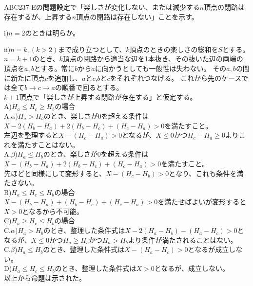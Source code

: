 \documentclass[11pt]{jsarticle}
\begin{document}
	ABC237-Eの問題設定で「楽しさが変化しない、または減少する$n$頂点の閉路は存在するが、上昇する$n$頂点の閉路は存在しない」ことを示す。
	\par i)$n = 2$のときは明らか。
	\par ii)$n = k,(k > 2)$まで成り立つとして、$k$頂点のときの楽しさの総和を$S$とする。
			$n = k + 1$のとき、$k$頂点の閉路から適当な辺を1本抜き、その抜いた辺の両端の頂点を$a,b$とする。常に$b$から$a$に向かうとしても一般性は失わない。
			その$a,b$の間に新たに頂点$c$を追加し、$a$と$c$,$b$と$c$をそれぞれつなげる。	これから先のケースでは全て$b \rightarrow c \rightarrow a$の順番で回るとする。\\
			$k+1$頂点で「楽しさが上昇する閉路が存在する」と仮定する。\\
			A)$H_a \leq H_c \geq H_b$の場合\\
			A.$\alpha$)$H_a > H_b$のとき、楽しさが0を超える条件は$X - 2(H_b - H_a) + 2(H_b - H_c) + (H_c - H_a) > 0$を満たすこと。\\
			左辺を整理すると$X - (H_c - H_a) > 0$となるが、$X \leq 0$かつ$H_c - H_a \geq 0$よりこれを満たすことはない。\\
			A.$\beta$)$H_a \leq H_b$のとき、楽しさが0を超える条件は$X - (H_b - H_a) + 2(H_b - H_c) + (H_c - H_a) > 0$を満たすこと。\\
			先ほどと同様にして変形すると、$X - (H_c - H_b) > 0$となり、これも条件を満たさない。\\
			B)$H_a \leq H_c \leq H_b$の場合\\
			$X - (H_b - H_a) + (H_b - H_c) + (H_c - H_a) > 0$を満たせばよいが変形すると$X > 0$となるから不可能。\\
			C)$H_a \geq H_c \leq H_b$の場合\\
			C.$\alpha$)$H_a > H_b$のとき、整理した条件式は$X - 2(H_a - H_b) - (H_a - H_c) > 0$となるが、$X \leq 0$かつ$H_a \geq H_c$かつ$H_a > H_b$より条件が満たされることはない。\\
			C.$\beta$)$H_a \leq H_b$のとき、整理した条件式は$X - (H_a - H_c) > 0$となるが成立しない。\\
			D)$H_a \leq H_c \leq H_b$のとき、整理した条件式は$X > 0$となるが、成立しない。\\
	以上から命題は示された。
\end{document}
